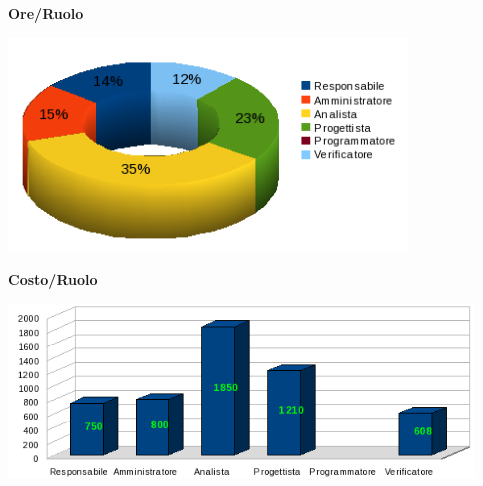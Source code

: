 \newpage
\begin{center}\textbf{Ore/Ruolo}
\end{center}
\includegraphics[width=300pt]{RR_RPP_Ore}

\begin{center}\textbf{Costo/Ruolo}
\end{center}
\includegraphics[width=350pt]{RR_RPP_Costi}
\newpage

